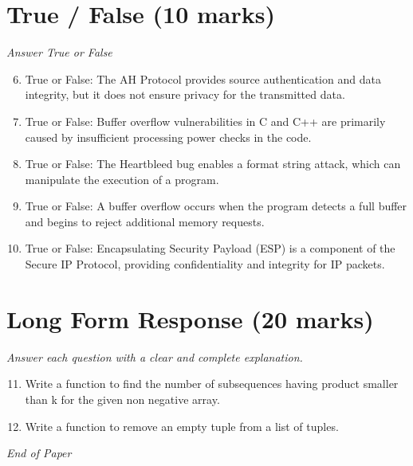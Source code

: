 \documentclass[12pt]{article}
\begin{document}
\section*{True / False (10 marks)}
\textit{Answer True or False}
\begin{enumerate}[label=\arabic*.]
\setcounter{enumi}{5}
\item True or False: The AH Protocol provides source authentication and data integrity, but it does not ensure privacy for the transmitted data.
\item True or False: Buffer overflow vulnerabilities in C and C++ are primarily caused by insufficient processing power checks in the code.
\item True or False: The Heartbleed bug enables a format string attack, which can manipulate the execution of a program.
\item True or False: A buffer overflow occurs when the program detects a full buffer and begins to reject additional memory requests.
\item True or False: Encapsulating Security Payload (ESP) is a component of the Secure IP Protocol, providing confidentiality and integrity for IP packets.
\end{enumerate}

\section*{Long Form Response (20 marks)}
\textit{Answer each question with a clear and complete explanation.}
\begin{enumerate}[label=\arabic*.]
\setcounter{enumi}{10}
\item Write a function to find the number of subsequences having product smaller than k for the given non negative array.
\item Write a function to remove an empty tuple from a list of tuples.
\end{enumerate}

\vfill
\noindent\textit{End of Paper}
\end{document}
